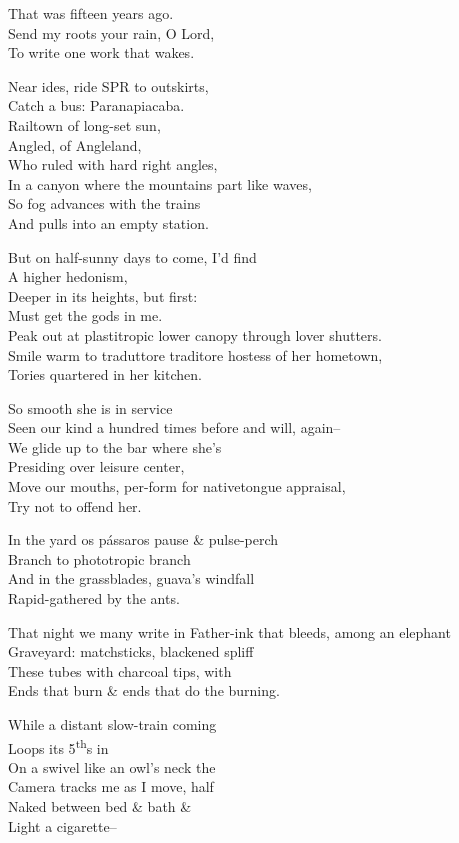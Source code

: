 That was fifteen years ago. \\
Send my roots your rain, O Lord, \\
To write one work that wakes.

Near ides, ride SPR to outskirts, \\
Catch a bus: Paranapiacaba. \\
Railtown of long-set sun, \\
Angled, of Angleland, \\
Who ruled with hard right angles, \\
In a canyon where the mountains part like waves, \\
So fog advances with the trains \\
And pulls into an empty station.

But on half-sunny days to come, I'd find \\
A higher hedonism, \\
Deeper in its heights, but first: \\
Must get the gods in me. \\
Peak out at plastitropic lower canopy through lover shutters. \\
Smile warm to traduttore traditore hostess of her hometown, \\
Tories quartered in her kitchen.

So smooth she is in service \\
Seen our kind a hundred times before and will, again-- \\
We glide up to the bar where she's \\
Presiding over leisure center, \\ 
Move our mouths, per-form for nativetongue appraisal, \\
Try not to offend her.

In the yard os pássaros pause \& pulse-perch \\
Branch to phototropic branch \\
And in the grassblades, guava's windfall \\
Rapid-gathered by the ants.

That night we many write in Father-ink that bleeds, among an elephant \\
Graveyard: matchsticks, blackened spliff \\
These tubes with charcoal tips, with \\
Ends that burn \& ends that do the burning.

While a distant slow-train coming \\
Loops its 5\textsuperscript{th}s in \: \\
On a swivel like an owl's neck the \\
Camera tracks me as I move, half \\
Naked between bed \& bath \& \\
Light a cigarette--

